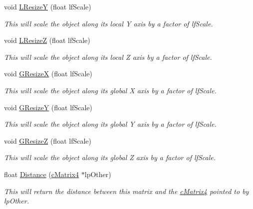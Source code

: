 \begin{DoxyCompactItemize}
void \hyperlink{classc_matrix4_a76758088b43a4a6f37d3953f9daa2d08}{LResizeY} (float lfScale)
\begin{DoxyCompactList}\small\item\em This will scale the object along its local Y axis by a factor of lfScale. \item\end{DoxyCompactList}\item 
void \hyperlink{classc_matrix4_a9f8ea70fb545b786ecc4575d0173baf1}{LResizeZ} (float lfScale)
\begin{DoxyCompactList}\small\item\em This will scale the object along its local Z axis by a factor of lfScale. \item\end{DoxyCompactList}\item 
void \hyperlink{classc_matrix4_ac2be3e4653b0c8324c6a505e54544043}{GResizeX} (float lfScale)
\begin{DoxyCompactList}\small\item\em This will scale the object along its global X axis by a factor of lfScale. \item\end{DoxyCompactList}\item 
void \hyperlink{classc_matrix4_a13fda6e0dc1b19f7f136c1963bbdac77}{GResizeY} (float lfScale)
\begin{DoxyCompactList}\small\item\em This will scale the object along its global Y axis by a factor of lfScale. \item\end{DoxyCompactList}\item 
void \hyperlink{classc_matrix4_a74217e4c12e8f5623a572535ba443bc4}{GResizeZ} (float lfScale)
\begin{DoxyCompactList}\small\item\em This will scale the object along its global Z axis by a factor of lfScale. \item\end{DoxyCompactList}\item 
float \hyperlink{classc_matrix4_acd04bb06d1d12807b203b0aaf9e9b608}{Distance} (\hyperlink{classc_matrix4}{cMatrix4} $\ast$lpOther)
\begin{DoxyCompactList}\small\item\em This will return the distance between this matrix and the \hyperlink{classc_matrix4}{cMatrix4} pointed to by lpOther. \item\end{DoxyCompactList}\item 

\end{DoxyCompactItemize}
